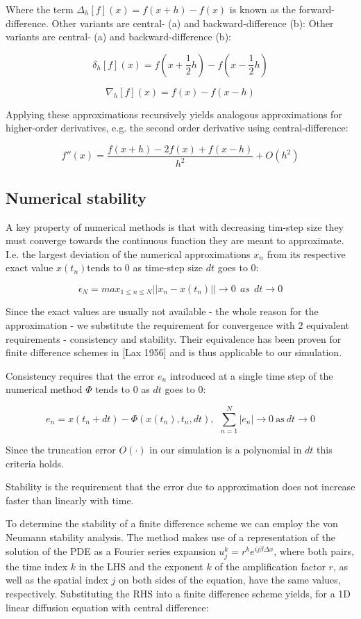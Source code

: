 \documentclass{article}
\begin{document}
Where the term $\Delta_h[f](x)=f(x+h)-f(x)$ is known as the forward-difference. Other variants are central- (a) and backward-difference (b): Other variants are central- (a) and backward-difference (b):

$$\delta_h[f](x)=f(x+\frac{1}{2}h)-f(x-\frac{1}{2}h)$$

$$\nabla_h[f](x) = f(x)-f(x-h)$$

Applying these approximations recursively yields analogous approximations for higher-order derivatives, e.g. the second order derivative using central-difference:

$$f''(x)=\frac{f(x+h)-2f(x)+f(x-h)}{h^2}+O(h^2)$$


\subsection{Numerical stability}

A key property of numerical methods is that with decreasing tim-step size they must converge towards the continuous function they are meant to approximate. I.e. the largest deviation of the numerical approximations $x_n$ from its respective exact value $x(t_n)$tends to 0 as time-step size $dt$ goes to 0:

$$\epsilon_N=max_{1\le n\le N}||x_n-x(t_n)||\to0\ \ as\ \ dt\to 0$$

Since the exact values are usually not available - the whole reason for the approximation - we substitute the requirement for convergence with 2 equivalent requirements - consistency and stability. Their equivalence has been proven for finite difference schemes in [Lax 1956] and is thus applicable to our simulation.

Consistency requires that the error $e_n$ introduced at a single time step of the numerical method $\Phi$ tends to 0 as $dt$ goes to 0:

$$e_n = x(t_n+dt) - \Phi(x(t_n),t_n,dt),\ \ \sum_{n=1}^N|e_n|\to 0\ \mathrm{as}\ dt\to 0$$

 Since the truncation error $O(\cdot)$ in our simulation is a polynomial in $dt$ this criteria holds.

 
 Stability is the requirement that the error due to approximation does not increase faster than linearly with time. 

To determine the stability of a finite difference scheme we can employ the von Neumann stability analysis. The method makes use of a representation of the solution of the PDE as a Fourier series expansion $u_j^k=r^ke^{ij\beta \Delta x}$, where both pairs, the time index $k$ in the LHS and the exponent $k$ of the amplification factor $r$, as well as the spatial index $j$ on both sides of the equation, have the same values, respectively. Substituting the RHS into a finite difference scheme yields, for a 1D linear diffusion equation with central difference:
\end{document}
